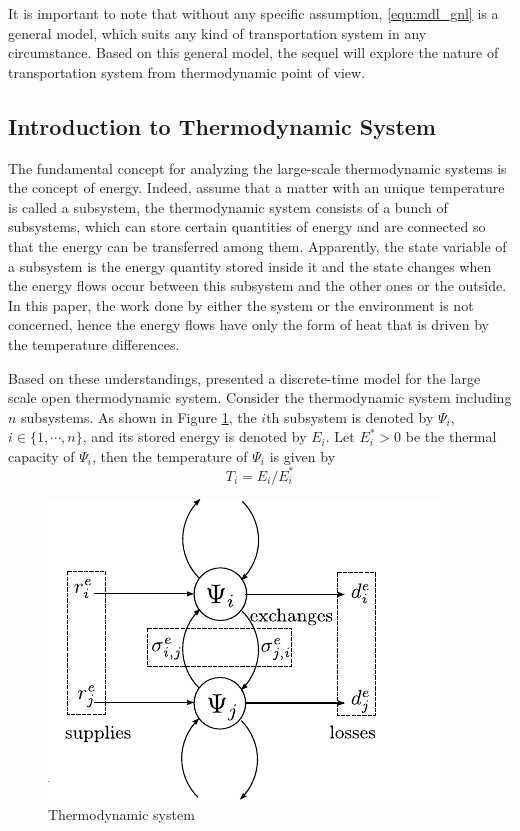 \documentclass[preprint,authoryear,12pt]{elsarticle}
\begin{document}
It is important to note that without any specific assumption,
\eqref{equ:mdl_gnl} is a general model, which suits any kind of
transportation system in any circumstance. Based on this general
model, the sequel will explore the nature of transportation system
from thermodynamic point of view.

\subsection{Introduction to Thermodynamic System}

The fundamental concept for analyzing the large-scale thermodynamic
systems is the concept of energy. Indeed, assume that a matter with
an unique temperature is called a subsystem, the thermodynamic system
consists of a bunch of subsystems, which can store certain quantities
of energy and are connected so that the energy can be transferred
among them. Apparently, the state variable of a subsystem is the
energy quantity stored inside it and the state changes when the
energy flows occur between this subsystem and the other ones or the
outside. In this paper, the work done by either the system or the
environment is not concerned, hence the energy flows have only the
form of heat that is driven by the temperature differences.

Based on these understandings, \citet{haddad_thermodynamic_2005}
presented a discrete-time model for the large scale open
thermodynamic system. Consider the thermodynamic system including $n$
subsystems. As shown in Figure \ref{fig:Ther_Sys}, the $i$th
subsystem is denoted by $\Psi_i$, $i\in \{1,\cdots,n\}$, and its
stored energy is denoted by $E_i$. Let $E_i^*>0$ be the thermal
capacity of $\Psi_i$, then the temperature of $\Psi_i$ is given by
\begin{equation}\label{equ:temperature}
    T_i= {E_i}/{E^*_i}
\end{equation}

\begin{figure}[ht]
  \centering
  \includegraphics{pics/HModel}
  \caption{Thermodynamic system}
  \label{fig:Ther_Sys}
\end{figure}
\end{document}
